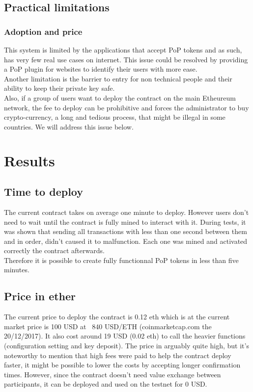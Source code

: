 \documentclass[11pt, a4paper, twoside, openright]{article} %
\begin{document}
\subsection{Practical limitations}
\subsubsection*{Adoption and price}
This system is limited by the applications that accept PoP tokens and as such, has very few real use cases on internet. This issue could be resolved by providing a PoP plugin for websites to identify their users with more ease. \\
Another limitation is the barrier to entry for non technical people and their ability to keep their private key safe.\\
Also, if a group of users want to deploy the contract on the main Etheureum network, the fee to deploy can be prohibitive and forces the administrator to buy crypto-currency, a long and tedious process, that might be illegal in some countries. We will address this issue below.
\section{Results}
\subsection{Time to deploy}
The current contract takes on average one minute to deploy. However users don't need to wait until the contract is fully mined to interact with it. During tests, it was shown that sending all transactions with less than one second between them and in order, didn't caused it to malfunction. Each one was mined and activated correctly the contract afterwards. \\
Therefore it is possible to create fully functionnal PoP tokens in less than five minutes.
\subsection{Price in ether}
The current price to deploy the contract is 0.12 eth which is at the current market price is 100 USD at ~840 USD/ETH (coinmarketcap.com the 20/12/2017). It also cost around 19 USD (0.02 eth) to call the heavier functions (configuration setting and key deposit). The price in arguably quite high, but it's noteworthy to mention that high fees were paid to help the contract deploy faster, it might be possible to lower the costs by accepting longer confirmation times. However, since the contract doesn't need value exchange between participants, it can be deployed and used on the testnet for 0 USD.
\end{document}

